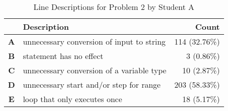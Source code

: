 \begin{table}
\centering
\caption{Line Descriptions for Problem 2 by Student A}
\label{table:problem2_studentA}
\renewcommand{\arraystretch}{0.5}
\begin{tabular}{|c|l|r|}
\hline
\textbf{} & \textbf{Description} & \textbf{Count} \\ \hline
\textbf{A} & unnecessary conversion of input to string & 114 (32.76\%) \\ \hline
\textbf{B} & statement has no effect & 3 (0.86\%) \\ \hline
\textbf{C} & unnecessary conversion of a variable type & 10 (2.87\%) \\ \hline
\textbf{D} & unnecessary start and/or step for range & 203 (58.33\%) \\ \hline
\textbf{E} & loop that only executes once & 18 (5.17\%) \\ \hline
\end{tabular}
\end{table}
